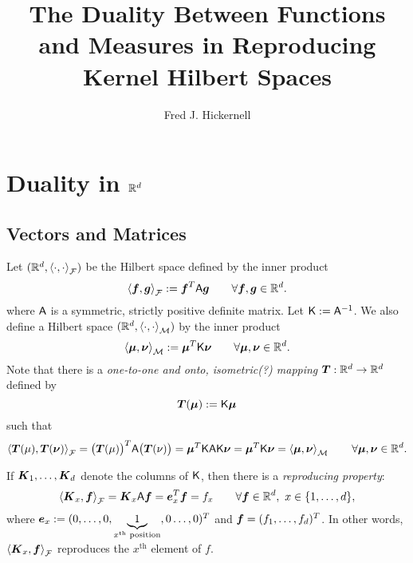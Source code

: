 \documentclass[reqno]{amsart}
\begin{document}
\title{The Duality Between Functions and Measures in Reproducing Kernel Hilbert Spaces}
\author{Fred J. Hickernell}


\maketitle

\section{Duality in $\reals^d$}

\subsection{Vectors and Matrices}

Let $(\reals^d,\ip[\cf]{\cdot}{\cdot})$ be the Hilbert space defined by the inner product 
\begin{equation*}
    \ip[\cf]{\vf}{\vg} := \vf^T \mA \vg \qquad \forall \vf, \vg \in \reals^d.
\end{equation*}
where $\mA$ is a symmetric, strictly positive definite matrix.  Let $\mK :=  \mA^{-1}$.  We also define a Hilbert space $(\reals^d,\ip[\cm]{\cdot}{\cdot})$ by the inner product
\begin{equation*}
    \ip[\cm]{\vmu}{\vnu} := \vmu^T \mK \vnu \qquad \forall \vmu, \vnu \in \reals^d.
\end{equation*}
Note that there is a \emph{one-to-one and onto, isometric(?) mapping} $\vT: \reals^d \to \reals^d$ defined by 
\[
\vT(\vmu) := \mK \vmu
\]
such that 
\begin{equation*}
    \ip[\cf]{\vT(\mu)}{\vT(\vnu)} = \bigl(\vT(\mu)\bigr)^T \mA \bigl(\vT(\nu)\bigr) = \vmu^T \mK \mA \mK \vnu = \vmu^T \mK \vnu = \ip[\cm]{\vmu}{\vnu} \qquad \forall \vmu, \vnu \in \reals^d.
\end{equation*}


If $\vK_1, \ldots, \vK_d$ denote the columns of $\mK$, then there is a \emph{reproducing property}:
\begin{equation*}
    \ip[\cf]{\vK_x}{\vf} = \vK_x \mA \vf = \ve_x^T \vf = f_x \qquad \forall \vf \in \reals^d, \ x \in \{1, \ldots, d\},
\end{equation*}
where $\ve_x := (0, \ldots, 0,\underbrace{1}_{x^{\text{th}} \text{ position}}, 0 \ldots, 0)^T$ and $\vf = (f_1, \ldots, f_d)^T$.  In other words, $ \ip[\cf]{\vK_x}{\vf}$ reproduces the $x^{\text{th}}$ element of $f$.
\end{document}
